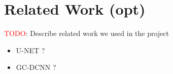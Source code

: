 \section{Related Work (opt)}

\textcolor{red}{TODO}: Describe related work we used in the project

\begin{itemize}
    \item U-NET \cite{ronneberger2015unet}?
    \item GC-DCNN \cite{LAN2020156}?
\end{itemize}
